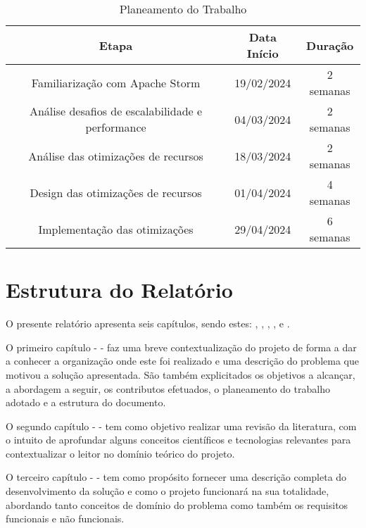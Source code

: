 \begin{table}[H]
  \begin{center}
    \caption{Planeamento do Trabalho}
    \vspace{5mm}
    \label{tab:plan}
    \begin{tabular}{|c|c|c|}
      \hline
      \textbf{Etapa} & \textbf{Data Início} & \textbf{Duração} \\ \hline
      Familiarização com Apache Storm  & 19/02/2024 & 2 semanas \\ \hline
      Análise desafios de escalabilidade e performance & 04/03/2024 & 2 semanas \\ \hline
      Análise das otimizações de recursos & 18/03/2024 & 2 semanas \\ \hline
      Design das otimizações de recursos & 01/04/2024 & 4 semanas \\ \hline
      Implementação das otimizações & 29/04/2024 & 6 semanas \\ \hline
    \end{tabular}
  \end{center}
\end{table}

\section{Estrutura do Relatório}

O presente relatório apresenta seis capítulos, sendo estes: ,
, , , 
 e .

O primeiro capítulo -  - faz uma breve contextualização do projeto de
forma a dar a conhecer a organização onde este foi realizado e uma descrição do problema que motivou
a solução apresentada. São também explicitados os objetivos a alcançar, a abordagem a seguir, os
contributos efetuados, o planeamento do trabalho adotado e a estrutura do documento. 

O segundo capítulo -  - tem como objetivo realizar uma revisão da
literatura, com o intuito de aprofundar alguns conceitos científicos e tecnologias relevantes 
para contextualizar o leitor no domínio teórico do projeto.  

O terceiro capítulo -  - tem como propósito fornecer uma descrição completa 
do desenvolvimento da solução e como o projeto funcionará na sua totalidade, abordando tanto conceitos
de domínio do problema como também os requisitos funcionais e não funcionais.

